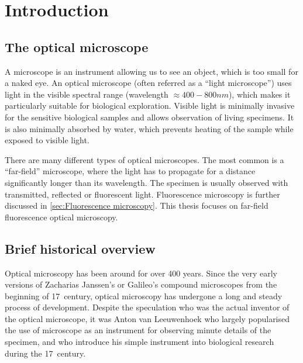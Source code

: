 \chapter{Introduction\label{ch:Introduction}}


\section{The optical microscope}

A microscope is an instrument allowing us to see an object, which is too small for a naked eye. An optical microscope (often referred as a ``light microscope'') uses light in the visible spectral range (wavelength $\approx400-800\unit{nm}$), which makes it particularly suitable for biological exploration. Visible light is minimally invasive for the sensitive biological samples and allows observation of living specimens. It is also minimally absorbed by water, which prevents heating of the sample while exposed to visible light.

There are many different types of optical microscopes. The most common is a ``far-field'' microscope, where the light has to propagate for a distance significantly longer than its wavelength. The specimen is usually observed with transmitted, reflected or fluorescent light. Fluorescence microscopy is further discussed in \autoref{sec:Fluorescence microscopy}. This thesis focuses on far-field fluorescence optical microscopy.


\section{Brief historical overview}

Optical microscopy has been around for over 400 years. Since the very early versions of Zacharias Janssen's or Galileo's compound microscopes from the beginning of 17\ths\ century, optical microscopy has undergone a long and steady process of development. Despite the speculation who was the actual inventor of the optical microscope, it was Anton van Leeuwenhoek who largely popularised the use of microscope as an instrument for observing minute details of the specimen, and who introduce his simple instrument into biological research during the 17\ths\ century. 

